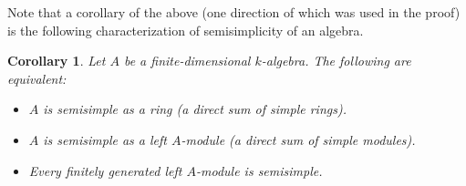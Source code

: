 \documentclass[12pt]{article}
\theoremstyle{plain}
\newtheorem{corollary}[theorem]{Corollary}
\theoremstyle{definition}
\theoremstyle{remark}
\numberwithin{equation}{section}
\begin{document}
Note that a corollary of the above (one direction of which was used in
the proof) is the following characterization of semisimplicity of an
algebra.

\begin{corollary}
Let $A$ be a finite-dimensional $k$-algebra.
The following are equivalent:
\begin{itemize}
\item $A$ is semisimple as a ring (a direct sum of simple rings).
\item $A$ is semisimple as a left $A$-module (a direct sum of simple
modules).
\item Every finitely generated left $A$-module is semisimple.
\end{itemize}
\end{corollary}



\end{document}
